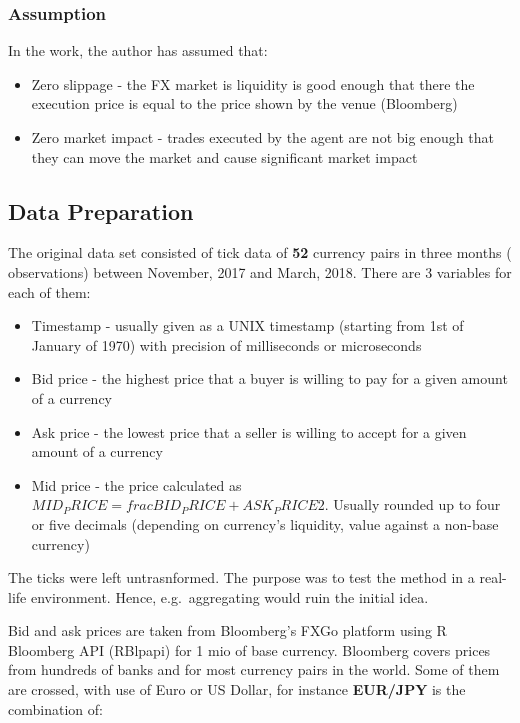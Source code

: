 \documentclass[]{article}
\providecommand{\tightlist}{%
  \setlength{\itemsep}{0pt}\setlength{\parskip}{0pt}}
\begin{document}
\subsubsection{Assumption}\label{assumption}

In the work, the author has assumed that:

\begin{itemize}
\tightlist
\item
  Zero slippage - the FX market is liquidity is good enough that there
  the execution price is equal to the price shown by the venue
  (Bloomberg)
\item
  Zero market impact - trades executed by the agent are not big enough
  that they can move the market and cause significant market impact
\end{itemize}

\subsection{Data Preparation}\label{data-preparation}

The original data set consisted of tick data of \textbf{52} currency
pairs in three months ( observations) between November, 2017 and March,
2018. There are 3 variables for each of them:

\begin{itemize}
\tightlist
\item
  Timestamp - usually given as a UNIX timestamp (starting from 1st of
  January of 1970) with precision of milliseconds or microseconds
\item
  Bid price - the highest price that a buyer is willing to pay for a
  given amount of a currency
\item
  Ask price - the lowest price that a seller is willing to accept for a
  given amount of a currency
\item
  Mid price - the price calculated as
  \(MID_PRICE = frac{BID_PRICE + ASK_PRICE}{2}\). Usually rounded up to
  four or five decimals (depending on currency's liquidity, value
  against a non-base currency)
\end{itemize}

The ticks were left untrasnformed. The purpose was to test the method in
a real-life environment. Hence, e.g.~aggregating would ruin the initial
idea.

Bid and ask prices are taken from Bloomberg's FXGo platform using R
Bloomberg API (RBlpapi) for 1 mio of base currency. Bloomberg covers
prices from hundreds of banks and for most currency pairs in the world.
Some of them are crossed, with use of Euro or US Dollar, for instance
\textbf{EUR/JPY} is the combination of:
\end{document}

